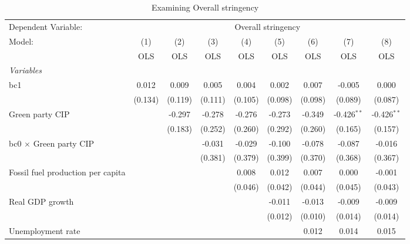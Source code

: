 
\begin{table}[htbp]
   \caption{Examining Overall stringency}
   \centering
   \begin{tabular}{lcccccccc}
      \toprule
      Dependent Variable: & \multicolumn{8}{c}{Overall stringency}\\
      Model:                                  & (1)     & (2)     & (3)     & (4)     & (5)     & (6)     & (7)           & (8)\\  
                                              &  OLS    & OLS     & OLS     & OLS     & OLS     & OLS     & OLS           & OLS\\  
      \midrule
      \emph{Variables}\\
      bc1                                     & 0.012   & 0.009   & 0.005   & 0.004   & 0.002   & 0.007   & -0.005        & 0.000\\   
                                              & (0.134) & (0.119) & (0.111) & (0.105) & (0.098) & (0.098) & (0.089)       & (0.087)\\   
      Green party CIP                         &         & -0.297  & -0.278  & -0.276  & -0.273  & -0.349  & -0.426$^{**}$ & -0.426$^{**}$\\   
                                              &         & (0.183) & (0.252) & (0.260) & (0.292) & (0.260) & (0.165)       & (0.157)\\   
      bc0 $\times$ Green party CIP            &         &         & -0.031  & -0.029  & -0.100  & -0.078  & -0.087        & -0.016\\   
                                              &         &         & (0.381) & (0.379) & (0.399) & (0.370) & (0.368)       & (0.367)\\   
      Fossil fuel production per capita       &         &         &         & 0.008   & 0.012   & 0.007   & 0.000         & -0.001\\   
                                              &         &         &         & (0.046) & (0.042) & (0.044) & (0.045)       & (0.043)\\   
      Real GDP growth                         &         &         &         &         & -0.011  & -0.013  & -0.009        & -0.009\\   
                                              &         &         &         &         & (0.012) & (0.010) & (0.014)       & (0.014)\\   
      Unemployment rate                       &         &         &         &         &         & 0.012   & 0.014         & 0.015\\   

\end{tabular}
\end{table}

